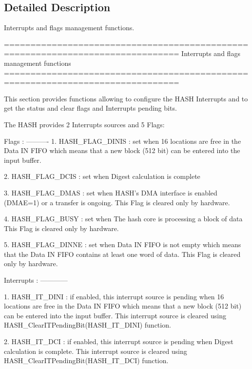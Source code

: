 \subsection{Detailed Description}
Interrupts and flags management functions. \begin{DoxyVerb} ===============================================================================
                   Interrupts and flags management functions
 ===============================================================================  

  This section provides functions allowing to configure the HASH Interrupts and 
  to get the status and clear flags and Interrupts pending bits.
  
  The HASH provides 2 Interrupts sources and 5 Flags:
  
  Flags :
  ---------- 
     1. HASH_FLAG_DINIS : set when 16 locations are free in the Data IN FIFO 
                          which means that a  new block (512 bit) can be entered 
                          into the input buffer.
                          
     2. HASH_FLAG_DCIS :  set when Digest calculation is complete
      
     3. HASH_FLAG_DMAS :  set when HASH's DMA interface is enabled (DMAE=1) or 
                          a transfer is ongoing.
                          This Flag is cleared only by hardware.
                           
     4. HASH_FLAG_BUSY :  set when The hash core is processing a block of data
                          This Flag is cleared only by hardware. 
                           
     5. HASH_FLAG_DINNE : set when Data IN FIFO is not empty which means that 
                          the Data IN FIFO contains at least one word of data.
                          This Flag is cleared only by hardware.
     
  Interrupts :
  ------------
    
   1. HASH_IT_DINI  : if enabled, this interrupt source is pending when 16 
                      locations are free in the Data IN FIFO  which means that 
                      a new block (512 bit) can be entered into the input buffer.
                      This interrupt source is cleared using 
                      HASH_ClearITPendingBit(HASH_IT_DINI) function.
   
   2. HASH_IT_DCI   : if enabled, this interrupt source is pending when Digest 
                      calculation is complete.
                      This interrupt source is cleared using 
                      HASH_ClearITPendingBit(HASH_IT_DCI) function.


\end{DoxyVerb}
